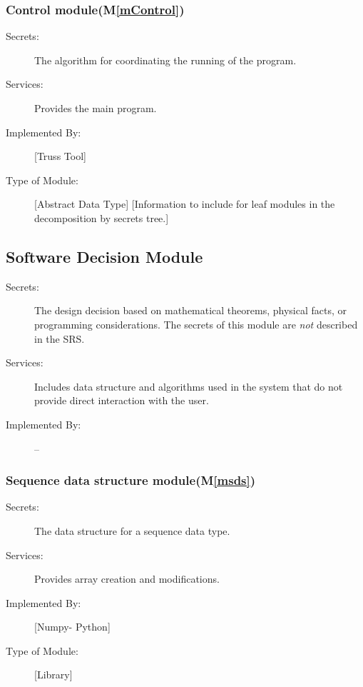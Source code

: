 \documentclass[12pt, titlepage]{article}
\newcommand{\mref}[1]{M\ref{#1}}
\begin{document}
\subsubsection{Control module(\mref{mControl})}

\begin{description}
\item[Secrets:]The algorithm for coordinating the running of the program.
\item[Services:] Provides the main program.
\item[Implemented By:] [Truss Tool]
\item[Type of Module:] [Abstract Data Type]
  [Information to include for leaf modules in the decomposition by secrets tree.]
\end{description}



\subsection{Software Decision Module}

\begin{description}
\item[Secrets:] The design decision based on mathematical theorems, physical
  facts, or programming considerations. The secrets of this module are
  \emph{not} described in the SRS.
\item[Services:] Includes data structure and algorithms used in the system that
  do not provide direct interaction with the user. 
\item[Implemented By:] --
\end{description}
\subsubsection{Sequence data structure module(\mref{msds})}

\begin{description}
\item[Secrets:]The data structure  for a sequence data type.
\item[Services:] Provides array creation and modifications.
\item[Implemented By:] [Numpy- Python]
\item[Type of Module:] [Library]
 
\end{description}
\end{document}
